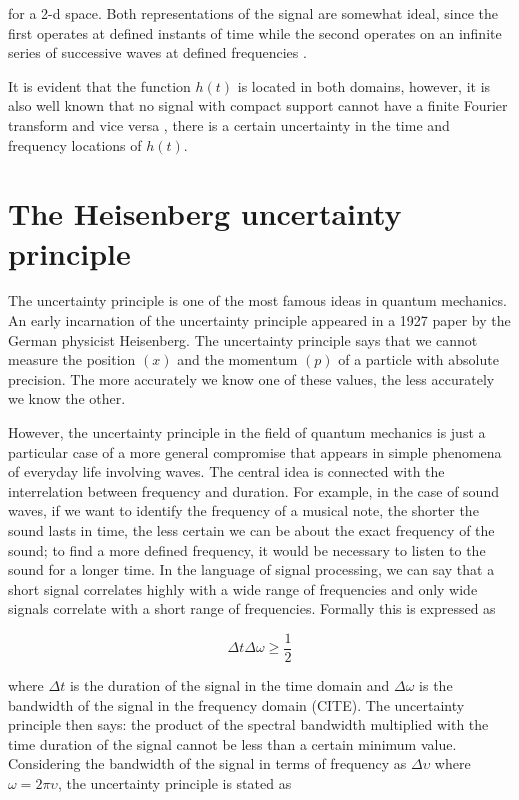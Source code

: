 for a 2-d space. Both representations of the signal are somewhat ideal, since the first operates at defined instants of time while the second operates on an infinite series of successive waves at defined frequencies \cite{Gabor:JIEE:1946a}. 

It is evident that the function $h(t)$ is located in both domains, however, it is also well known that no signal with compact support cannot have a finite Fourier transform and vice versa \cite{Bracewell:FourierBook:1999}, there is a certain uncertainty in the time and frequency locations of $h(t)$.

\section{The Heisenberg uncertainty principle }

The uncertainty principle is one of the most famous ideas in quantum mechanics. An early incarnation of the uncertainty principle appeared in a 1927 paper by the German physicist Heisenberg. The uncertainty principle says that we cannot measure the position $(x)$ and the momentum $(p)$ of a particle with absolute precision. The more accurately we know one of these values, the less accurately we know the other. 

However, the uncertainty principle in the field of quantum mechanics is just a particular case of a more general compromise that appears in simple phenomena of everyday life involving waves. The central idea is connected with the interrelation between frequency and duration. For example, in the case of sound waves, if we want to identify the frequency of a musical note, the shorter the sound lasts in time, the less certain we can be about the exact frequency of the sound; to find a more defined frequency, it would be necessary to listen to the sound for a longer time. In the language of signal processing, we can say that a short signal correlates highly with a wide range of frequencies and only wide signals correlate with a short range of frequencies. Formally this is expressed as

\begin{equation}\label{eq:uncertainty_principle_rad}
	\Delta t\Delta \omega \geq \frac{1}{2}
\end{equation}

where $\Delta t$ is the duration of the signal in the time domain and $\Delta \omega$ is the bandwidth of the signal in the frequency domain (CITE). The uncertainty principle then says: the product of the spectral bandwidth multiplied with the time duration of the signal cannot be less than a certain minimum value. Considering the bandwidth of the signal in terms of frequency as $\Delta \upsilon$ where $\omega = 2\pi \upsilon$, the uncertainty principle is stated as 

